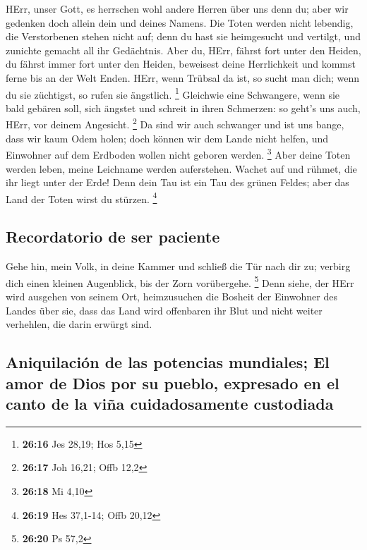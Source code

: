  HErr, unser Gott, es herrschen wohl andere Herren über
uns denn du; aber wir gedenken doch allein dein und deines Namens.
 Die Toten werden nicht lebendig, die Verstorbenen stehen
nicht auf; denn du hast sie heimgesucht und vertilgt, und zunichte
gemacht all ihr Gedächtnis.  Aber du, HErr, fährst fort
unter den Heiden, du fährst immer fort unter den Heiden, beweisest deine
Herrlichkeit und kommst ferne bis an der Welt Enden. 
HErr, wenn Trübsal da ist, so sucht man dich; wenn du sie züchtigst, so
rufen sie ängstlich. \footnote{\textbf{26:16} Jes 28,19; Hos 5,15}
 Gleichwie eine Schwangere, wenn sie bald gebären soll,
sich ängstet und schreit in ihren Schmerzen: so geht's uns auch, HErr,
vor deinem Angesicht. \footnote{\textbf{26:17} Joh 16,21; Offb 12,2}
 Da sind wir auch schwanger und ist uns bange, dass wir
kaum Odem holen; doch können wir dem Lande nicht helfen, und Einwohner
auf dem Erdboden wollen nicht geboren werden. \footnote{\textbf{26:18}
  Mi 4,10}  Aber deine Toten werden leben, meine
Leichname werden auferstehen. Wachet auf und rühmet, die ihr liegt unter
der Erde! Denn dein Tau ist ein Tau des grünen Feldes; aber das Land der
Toten wirst du stürzen. \footnote{\textbf{26:19} Hes 37,1-14; Offb 20,12}

\hypertarget{recordatorio-de-ser-paciente}{%
\subsection{Recordatorio de ser
paciente}\label{recordatorio-de-ser-paciente}}

 Gehe hin, mein Volk, in deine Kammer und schließ die Tür
nach dir zu; verbirg dich einen kleinen Augenblick, bis der Zorn
vorübergehe. \footnote{\textbf{26:20} Ps 57,2}  Denn
siehe, der HErr wird ausgehen von seinem Ort, heimzusuchen die Bosheit
der Einwohner des Landes über sie, dass das Land wird offenbaren ihr
Blut und nicht weiter verhehlen, die darin erwürgt sind.

\hypertarget{aniquilaciuxf3n-de-las-potencias-mundiales-el-amor-de-dios-por-su-pueblo-expresado-en-el-canto-de-la-viuxf1a-cuidadosamente-custodiada}{%
\subsection{Aniquilación de las potencias mundiales; El amor de Dios por
su pueblo, expresado en el canto de la viña cuidadosamente
custodiada}\label{aniquilaciuxf3n-de-las-potencias-mundiales-el-amor-de-dios-por-su-pueblo-expresado-en-el-canto-de-la-viuxf1a-cuidadosamente-custodiada}}

